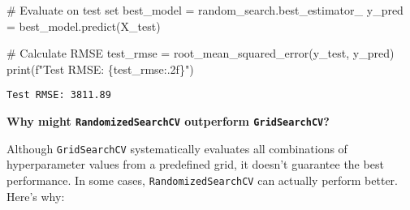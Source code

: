 \documentclass[
  letterpaper,
  DIV=11,
  numbers=noendperiod]{scrreprt}
\newenvironment{Shaded}{\begin{snugshade}}{\end{snugshade}}
\newcommand{\BuiltInTok}[1]{\textcolor[rgb]{0.00,0.23,0.31}{#1}}
\newcommand{\CommentTok}[1]{\textcolor[rgb]{0.37,0.37,0.37}{#1}}
\newcommand{\NormalTok}[1]{\textcolor[rgb]{0.00,0.23,0.31}{#1}}
\newcommand{\OperatorTok}[1]{\textcolor[rgb]{0.37,0.37,0.37}{#1}}
\newcommand{\SpecialCharTok}[1]{\textcolor[rgb]{0.37,0.37,0.37}{#1}}
\newcommand{\SpecialStringTok}[1]{\textcolor[rgb]{0.13,0.47,0.30}{#1}}
\begin{document}
\begin{Shaded}
\begin{Highlighting}[]
\CommentTok{\# Evaluate on test set}
\NormalTok{best\_model }\OperatorTok{=}\NormalTok{ random\_search.best\_estimator\_}
\NormalTok{y\_pred }\OperatorTok{=}\NormalTok{ best\_model.predict(X\_test)}

\CommentTok{\# Calculate RMSE}
\NormalTok{test\_rmse }\OperatorTok{=}\NormalTok{ root\_mean\_squared\_error(y\_test, y\_pred)}
\BuiltInTok{print}\NormalTok{(}\SpecialStringTok{f"Test RMSE: }\SpecialCharTok{\{}\NormalTok{test\_rmse}\SpecialCharTok{:.2f\}}\SpecialStringTok{"}\NormalTok{)}
\end{Highlighting}
\end{Shaded}

\begin{verbatim}
Test RMSE: 3811.89
\end{verbatim}

\textbf{Why might \texttt{RandomizedSearchCV} outperform
\texttt{GridSearchCV}?}

Although \texttt{GridSearchCV} systematically evaluates all combinations
of hyperparameter values from a predefined grid, it doesn't guarantee
the best performance. In some cases, \texttt{RandomizedSearchCV} can
actually perform better. Here's why:
\end{document}
